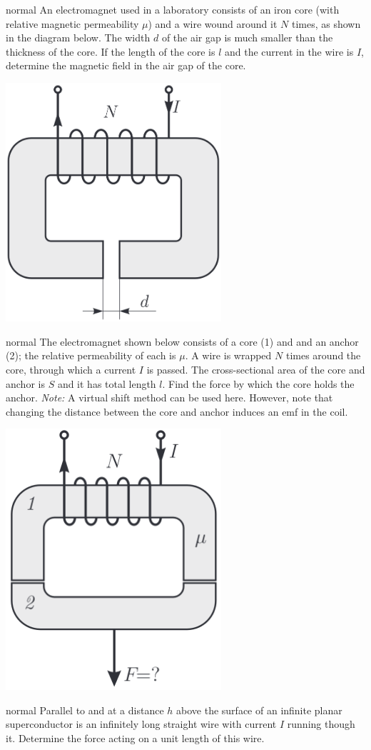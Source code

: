 \hypertarget{P132}{}
\begin{solution}{normal} %
An electromagnet used in a laboratory consists of an iron core (with relative magnetic permeability $\mu$) and a wire wound around it $N$ times, as shown in the diagram below. The width $d$ of the air gap is much smaller than the thickness of the core. If the length of the core is $l$ and the current in the wire is $I$, determine the magnetic field in the air gap of the core.
\begin{center}
    \includegraphics[width=0.6\textwidth]{S4 Figures/S4-132.png}
\end{center}
\end{solution}

\hypertarget{P133}{}
\begin{solution}{normal} %
The electromagnet shown below consists of a core (1) and and an anchor (2); the relative permeability of each is $\mu$. A wire is wrapped $N$ times around the core, through which a current $I$ is passed. The cross-sectional area of the core and anchor is $S$ and it has total length $l$. Find the force by which the core holds the anchor. \textit{Note:} A virtual shift method can be used here. However, note that changing the distance between the core and anchor induces an emf in the coil.
\begin{center}
    \includegraphics[width=0.6\textwidth]{S4 Figures/S4-133.png}
\end{center}
\end{solution}

\hypertarget{P134}{}
\begin{solution}{normal} %
Parallel to and at a distance $h$ above the surface of an infinite planar superconductor is an infinitely long straight wire with current $I$ running though it. Determine the force acting on a unit length of this wire.
\end{solution}